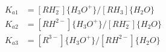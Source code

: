 \documentclass[fleqn, oneside, 11pt]{article}%
\begin{document}
\begin{preview}
\begin{align*}%
K_{a1} & = [RH^{-}_{2}] \{ H_{3}O^{+} \} / [RH_{3}] \{ H_{2}O \} \nonumber \\ 
K_{a2} & = [RH^{2-}] \{ H_{3}O^{+} \} / [RH^{-}_{2}] \{ H_{2}O \} \nonumber \\ 
K_{a3} & = [R^{3-}] \{ H_{3}O^{+} \} / [RH^{2-}] \{ H_{2}O \} \nonumber \\ 
\end{align*} 
\end{preview}
\end{document}
